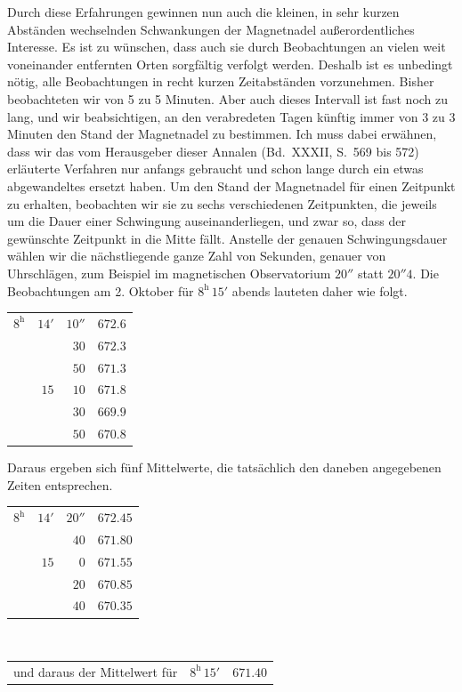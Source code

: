 Durch diese Erfahrungen gewinnen nun auch die kleinen, in sehr kurzen Abständen wechselnden Schwankungen der Magnetnadel außerordentliches Interesse. Es ist zu wünschen, dass auch sie durch Beobachtungen an vielen weit voneinander entfernten Orten sorgfältig verfolgt werden. Deshalb ist es unbedingt nötig, alle Beobachtungen in recht kurzen Zeitabständen vorzunehmen. Bisher beobachteten wir von 5 zu 5 Minuten. Aber auch dieses Intervall ist fast noch zu lang, und wir beabsichtigen, an den verabredeten Tagen künftig immer von 3 zu 3 Minuten den Stand der Magnetnadel zu bestimmen. Ich muss dabei erwähnen, dass wir das vom Herausgeber dieser Annalen (Bd.\ XXXII, S.\ 569 bis 572) erläuterte Verfahren nur anfangs gebraucht und schon lange durch ein etwas abgewandeltes ersetzt haben. Um den Stand der Magnetnadel für einen Zeitpunkt zu erhalten, beobachten wir sie zu sechs verschiedenen Zeitpunkten, die jeweils um die Dauer einer Schwingung auseinanderliegen, und zwar so, dass der gewünschte Zeitpunkt in die Mitte fällt. Anstelle der genauen Schwingungsdauer wählen wir die nächstliegende ganze Zahl von Sekunden, genauer von Uhrschlägen, zum Beispiel im magnetischen Observatorium $20''$ statt $20''4$. Die Beobachtungen am 2. Oktober für $8^{\mathrm h}\,15'$ abends lauteten daher wie folgt.
\begin{center}
\begin{tabular}{rrr|r}
$8^{\mathrm h}$ & $14'$ & $10''$ & $672.6$\\
 & & $30$ & $672.3$\\
 & & $50$ & $671.3$\\
 & $15$ & $10$ & $671.8$\\
 & & $30$ & $669.9$\\
 & & $50$ & $670.8$
\end{tabular}
\end{center}
Daraus ergeben sich fünf Mittelwerte, die tatsächlich den daneben angegebenen Zeiten entsprechen.
\begin{center}
\begin{tabular}{rrr|r}
$8^{\mathrm h}$ & $14'$ & $20''$ & $672.45$\\
 & & $40$ & $671.80$\\
 & $15$ & $0$ & $671.55$\\
 & & $20$ & $670.85$\\
 & & $40$ & $670.35$
\end{tabular}\\[2mm]
\begin{tabular}{lrr}
und daraus der Mittelwert für & $8^{\mathrm h}\,15'$ & $671.40$
\end{tabular}
\end{center}

